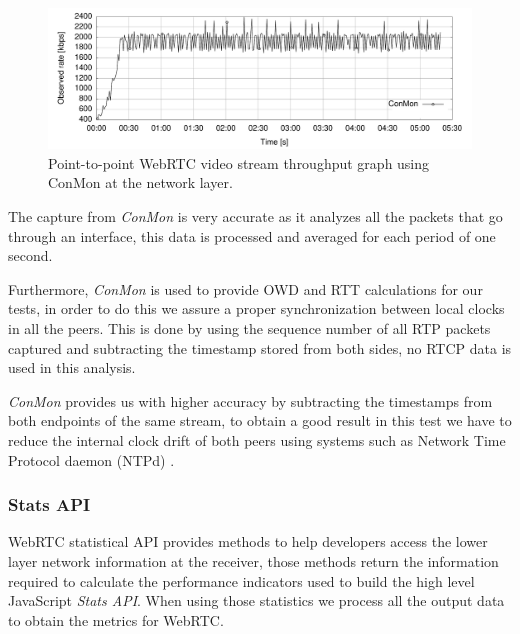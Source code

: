  \begin{figure}[h]
  \centering
    \includegraphics[width=1\textwidth]{./figures/onetooneWiFiConMon.pdf}
      \caption[Point-to-point WebRTC video stream throughput graph using ConMon at the network layer]{Point-to-point WebRTC video stream throughput graph using ConMon at the network layer.}
	\label{fig:onetooneWifiRTCConMon}
\end{figure}

The capture from {\it ConMon} is very accurate as it analyzes all the packets that go through an interface, this data is processed and averaged for each period of one second. 


Furthermore, {\it ConMon} is used to provide OWD and RTT calculations for our tests, in order to do this we assure a proper synchronization between local clocks in all the peers. This is done by using the sequence number of all RTP packets captured and subtracting the timestamp stored from both sides, no RTCP data is used in this analysis.

{\it ConMon} provides us with higher accuracy by subtracting the timestamps from both endpoints of the same stream, to obtain a good result in this test we have to reduce the internal clock drift of both peers using systems such as Network Time Protocol daemon (NTPd) .

\subsubsection{Stats API}

WebRTC statistical API provides methods to help developers access the lower layer network information at the receiver, those methods return the information required to calculate the performance indicators used to build the high level JavaScript {\it Stats API}. When using those statistics we process all the output data to obtain the metrics for WebRTC.

